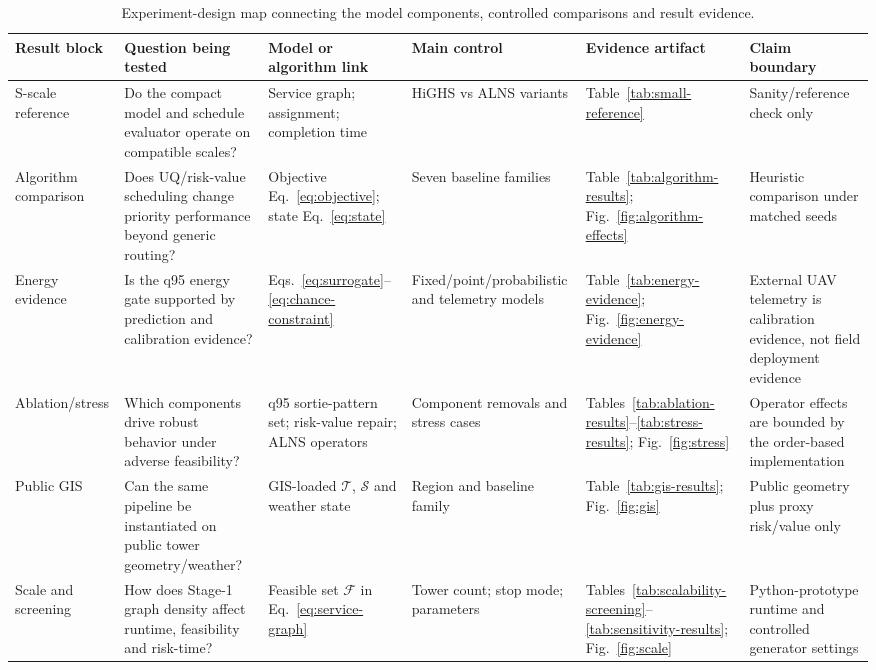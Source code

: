 ﻿\begin{table}[H]
\centering
\caption{Experiment-design map connecting the model components, controlled comparisons and result evidence.}
\label{tab:experiment-design-map}
\small
\setlength{\tabcolsep}{2.2pt}
\renewcommand{\arraystretch}{1.08}
\begin{tabularx}{\textwidth}{@{}>{\raggedright\arraybackslash}p{}>{\raggedright\arraybackslash}p{}>{\raggedright\arraybackslash}p{}>{\raggedright\arraybackslash}p{}>{\raggedright\arraybackslash}p{}>{\raggedright\arraybackslash}X@{}}
\toprule
Result block & Question being tested & Model or algorithm link & Main control & Evidence artifact & Claim boundary \\
\midrule
S-scale reference & Do the compact model and schedule evaluator operate on compatible scales? & Service graph; assignment; completion time & HiGHS vs ALNS variants & Table~\ref{tab:small-reference} & Sanity/reference check only \\
Algorithm comparison & Does UQ/risk-value scheduling change priority performance beyond generic routing? & Objective Eq.~\eqref{eq:objective}; state Eq.~\eqref{eq:state} & Seven baseline families & Table~\ref{tab:algorithm-results}; Fig.~\ref{fig:algorithm-effects} & Heuristic comparison under matched seeds \\
Energy evidence & Is the q95 energy gate supported by prediction and calibration evidence? & Eqs.~\eqref{eq:surrogate}--\eqref{eq:chance-constraint} & Fixed/point/probabilistic and telemetry models & Table~\ref{tab:energy-evidence}; Fig.~\ref{fig:energy-evidence} & External UAV telemetry is calibration evidence, not field deployment evidence \\
Ablation/stress & Which components drive robust behavior under adverse feasibility? & q95 sortie-pattern set; risk-value repair; ALNS operators & Component removals and stress cases & Tables~\ref{tab:ablation-results}--\ref{tab:stress-results}; Fig.~\ref{fig:stress} & Operator effects are bounded by the order-based implementation \\
Public GIS & Can the same pipeline be instantiated on public tower geometry/weather? & GIS-loaded $\mathcal{T}$, $\mathcal{S}$ and weather state & Region and baseline family & Table~\ref{tab:gis-results}; Fig.~\ref{fig:gis} & Public geometry plus proxy risk/value only \\
Scale and screening & How does Stage-1 graph density affect runtime, feasibility and risk-time? & Feasible set $\mathcal{F}$ in Eq.~\eqref{eq:service-graph} & Tower count; stop mode; parameters & Tables~\ref{tab:scalability-screening}--\ref{tab:sensitivity-results}; Fig.~\ref{fig:scale} & Python-prototype runtime and controlled generator settings \\
\bottomrule
\end{tabularx}
\end{table}
